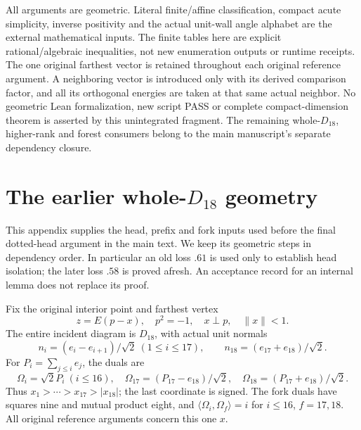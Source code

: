 \documentclass[11pt]{article}
\theoremstyle{definition}
\theoremstyle{remark}
\newcommand{\ip}[2]{\langle #1,#2\rangle}
\newcommand{\norm}[1]{\lVert #1\rVert}
\begin{document}
All arguments are geometric. Literal finite/affine classification,
compact acute simplicity, inverse positivity and the actual unit-wall
angle alphabet are the external mathematical inputs.
The finite tables here are explicit rational/algebraic inequalities,
not new enumeration outputs or runtime receipts.
The one original farthest vector is retained throughout each original
reference argument. A neighboring vector is introduced only with its
derived comparison factor, and all its orthogonal energies are taken
at that same actual neighbor.
No geometric Lean formalization, new script PASS or complete
compact-dimension theorem is asserted by this unintegrated fragment.
The remaining whole-\(D_{18}\), higher-rank and forest consumers
belong to the main manuscript's separate dependency closure.






\section{The earlier whole-\(D_{18}\) geometry}
\label{app:D18foundation}
This appendix supplies the head, prefix and fork inputs used before
the final dotted-head argument in the main text. We keep its geometric
steps in dependency order. In particular an old loss \(.61\) is used
only to establish head isolation; the later loss \(.58\) is proved
afresh. An acceptance record for an internal lemma does not replace
its proof.

Fix the original interior point and farthest vertex
\[
 z=E(p-x),\quad p^2=-1,\quad x\perp p,\quad \norm x<1.
\]
The entire incident diagram is \(D_{18}\), with actual unit normals
\[
 n_i=(e_i-e_{i+1})/\sqrt2\ (1\leq i\leq17),\qquad
 n_{18}=(e_{17}+e_{18})/\sqrt2 .
\]
For \(P_i=\sum_{j\leq i}e_j\), the duals are
\[
 \Omega_i=\sqrt2P_i\ (i\leq16),\quad
 \Omega_{17}=(P_{17}-e_{18})/\sqrt2,\quad
 \Omega_{18}=(P_{17}+e_{18})/\sqrt2.
\]
Thus \(x_1>\cdots>x_{17}>|x_{18}|\); the last coordinate is signed.
The fork duals have squares nine and mutual product eight, and
\(\ip{\Omega_i}{\Omega_f}=i\) for \(i\leq16\), \(f=17,18\).
All original reference arguments concern this one \(x\).
\end{document}
